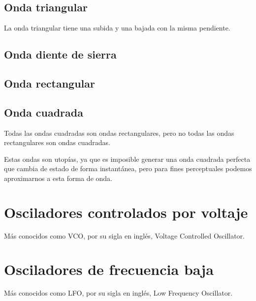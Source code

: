\documentclass[../principal.tex]{subfiles}
\begin{document}
\subsection{Onda triangular}

La onda triangular tiene una subida y una bajada con la misma pendiente.



\subsection{Onda diente de sierra}

\subsection{Onda rectangular}

\subsection{Onda cuadrada}

Todas las ondas cuadradas son ondas rectangulares, pero no todas las ondas rectangulares son ondas cuadradas.

Estas ondas son utopías, ya que es imposible generar una onda cuadrada perfecta que cambia de estado de forma instantánea, pero para fines perceptuales podemos aproximarnos a esta forma de onda.

\section{Osciladores controlados por voltaje}

Más conocidos como VCO, por su sigla en inglés, Voltage Controlled Oscillator.

\section{Osciladores de frecuencia baja}

Más conocidos como LFO, por su sigla en inglés, Low Frequency Oscillator.

\newpage
\end{document}
